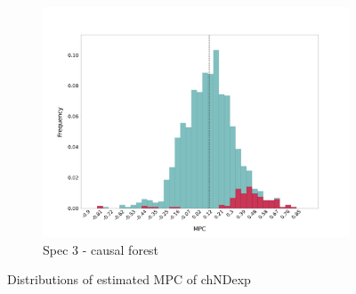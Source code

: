 \begin{figure}[t]
\begin{subfigure}{0.33\linewidth}
        \includegraphics[width=\linewidth]{figures/distributions/spec3_cf_chNDexp.png}
        \caption{Spec 3 - causal forest}
    \end{subfigure}\hfill
    \caption{Distributions of estimated MPC of chNDexp}
\end{figure}

